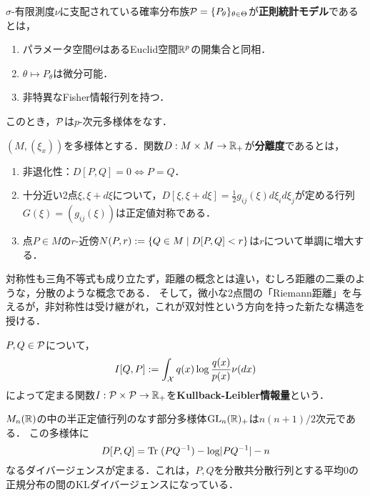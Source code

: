 \documentclass[uplatex,dvipdfmx]{jsreport}
\begin{document}
\begin{definition}
    $\sigma$-有限測度$\nu$に支配されている確率分布族$\P=\{P_\theta\}_{\theta\in\Theta}$が\textbf{正則統計モデル}であるとは，
    \begin{enumerate}
        \item パラメータ空間$\Theta$はあるEuclid空間$\R^p$の開集合と同相．
        \item $\theta\mapsto P_\theta$は微分可能．
        \item 非特異なFisher情報行列を持つ．
    \end{enumerate}
    このとき，$\P$は$p$-次元多様体をなす．
\end{definition}

\begin{definition}[divergence]
    $(M,(\xi_x))$を多様体とする．関数$D:M\times M\to\R_+$が\textbf{分離度}であるとは，
    \begin{enumerate}
        \item 非退化性：$D[P,Q]=0\Leftrightarrow P=Q$．
        \item 十分近い2点$\xi,\xi+d\xi$について，$D[\xi,\xi+d\xi]=\frac{1}{2}g_{ij}(\xi)d\xi_id\xi_j$が定める行列$G(\xi)=(g_{ij}(\xi))$は正定値対称である．
        \item 点$P\in M$の$r$-近傍$N(P,r):=\Brace{Q\in M\mid D[P,Q]<r}$は$r$について単調に増大する．
    \end{enumerate}
\end{definition}
\begin{remarks}
    対称性も三角不等式も成り立たず，距離の概念とは違い，むしろ距離の二乗のような，分散のような概念である．
    そして，微小な2点間の「Riemann距離」を与えるが，非対称性は受け継がれ，これが双対性という方向を持った新たな構造を授ける．
\end{remarks}

\begin{definition}
    $P,Q\in\P$について，
    \[I[Q,P]:=\int_\X q(x)\log\frac{q(x)}{p(x)}\nu(dx)\]
    によって定まる関数$I:\P\times\P\to\R_+$を\textbf{Kullback-Leibler情報量}という．
\end{definition}

\begin{example}[正規分布族のKL分離度]
    $M_n(\R)$の中の半正定値行列のなす部分多様体$\GL_n(\R)_+$は$n(n+1)/2$次元である．
    この多様体に
    \[D[P,Q]=\Tr(PQ^{-1})-\log\abs{PQ^{-1}}-n\]
    なるダイバージェンスが定まる．これは，$P,Q$を分散共分散行列とする平均$0$の正規分布の間のKLダイバージェンスになっている．
\end{example}
\end{document}

